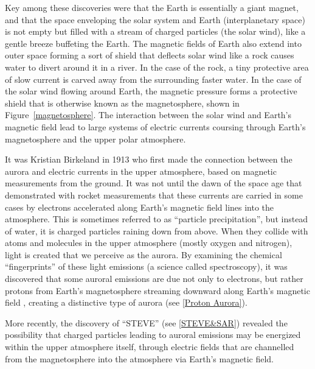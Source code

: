 \documentclass{article}
\renewcommand{\cite}[1]{\parencite{#1}}
\begin{document}
Key among these discoveries were that the Earth is essentially a giant magnet, and that the space enveloping the solar system and Earth (interplanetary space) is not empty but filled with a stream of charged particles (the solar wind), like a gentle breeze buffeting the Earth. The magnetic fields of Earth also extend into outer space forming a sort of shield that deflects solar wind like a rock causes water to divert around it in a river. In the case of the rock, a tiny protective area of slow current is carved away from the surrounding faster water. In the case of the solar wind flowing around Earth, the magnetic pressure forms a protective shield that is otherwise known as the magnetosphere, shown in Figure~\ref{magnetosphere}. The interaction between the solar wind and Earth's magnetic field lead to large systems of electric currents coursing through Earth's magnetosphere and the upper polar atmosphere. 

It was Kristian Birkeland in 1913 who first made the connection between the aurora and electric currents in the upper atmosphere, based on magnetic measurements from the ground. It was not until the dawn of the space age that \textcite{McIlwain1960} demonstrated with rocket measurements that these currents are carried in some cases by electrons accelerated along Earth's magnetic field lines into the atmosphere. This is sometimes referred to as ``particle precipitation'', but instead of water, it is charged particles raining down from above. When they collide with atoms and molecules in the upper atmosphere (mostly oxygen and nitrogen), light is created that we perceive as the aurora. By examining the chemical ``fingerprints'' of these light emissions (a science called spectroscopy), it was discovered that some auroral emissions are due not only to electrons, but rather protons from Earth's magnetosphere streaming downward along Earth's magnetic field \cite{Vegard1939}, creating a distinctive type of aurora (see \ref{Proton Aurora}).  

More recently, the discovery of ``STEVE'' (see \ref{STEVE&SAR}) \cite{MacDonald2018} revealed the possibility that charged particles leading to auroral emissions may be energized within the upper atmosphere itself, through electric fields that are channelled from the magnetosphere into the atmosphere via Earth's magnetic field.
\end{document}
